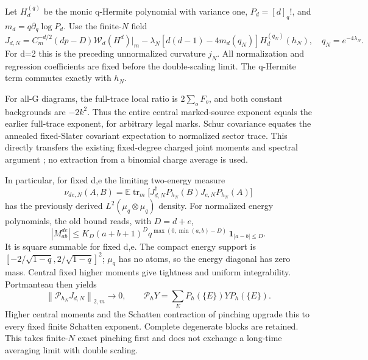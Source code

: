 \documentclass[11pt]{article}
\newcommand{\E}{\mathbb E}
\newcommand{\Wick}{\mathcal W}
\newcommand{\tr}{\operatorname{tr}}
\newcommand{\norm}[1]{\left\lVert#1\right\rVert}
\begin{document}
Let $H_d^{(q)}$ be the monic q-Hermite polynomial with variance one,
$P_d=[d]_q!$, and $m_d=q\partial_q\log P_d$. Use the finite-$N$ field
\begin{equation}
 J_{d,N}=C_m^{-d/2}(dp-D)\Wick_d(H^d)|_m
       -\lambda_N[d(d-1)-4m_d(q_N)]H_d^{(q_N)}(h_N),
 \quad q_N=e^{-4\lambda_N}.\label{Jd}
\end{equation}
For d=2 this is the preceding unnormalized curvature $j_N$.
All normalization and regression coefficients are fixed before the
double-scaling limit. The q-Hermite term commutes exactly with $h_N$.

For all-G diagrams, the full-trace local ratio is
$2\sum_o F_o$, and both constant backgrounds are $-2k^2$.
Thus the entire central marked-source exponent equals the earlier
full-trace exponent, for arbitrary legal marks. Schur covariance
equates the annealed fixed-Slater covariant expectation to normalized
sector trace. This directly transfers the existing fixed-degree
charged joint moments and spectral argument \cite{joint}; no extraction
from a binomial charge average is used.

In particular, for fixed d,e the limiting two-energy measure
\[
 \nu_{de,N}(A,B)=\E\tr_m\!\bigl[
 J_{d,N}^\dagger P_{h_N}(B)J_{e,N}P_{h_N}(A)\bigr]
\]
has the previously derived $L^2(\mu_q\otimes\mu_q)$ density.
For normalized energy polynomials, the old bound reads, with $D=d+e$,
\[
 |M_{ab}^{de}|\le K_D(a+b+1)^D
 q^{\max(0,\min(a,b)-D)}\,\mathbf1_{|a-b|\le D}.
\]
It is square summable for fixed d,e. The compact energy support is
$[-2/\sqrt{1-q},2/\sqrt{1-q}]^2$; $\mu_q$ has no atoms, so the
energy diagonal has zero mass. Central fixed higher moments give
tightness and uniform integrability. Portmanteau then yields
\begin{equation}
 \norm{\mathcal P_{h_N}J_{d,N}}_{2,m}\longrightarrow0,
 \qquad \mathcal P_hY=\sum_E P_h(\{E\})YP_h(\{E\}).\label{pinch}
\end{equation}
Higher central moments and the Schatten contraction of pinching upgrade
this to every fixed finite Schatten exponent. Complete degenerate
blocks are retained. This takes finite-$N$ exact pinching first and
does not exchange a long-time averaging limit with double scaling.

\newpage
\end{document}
